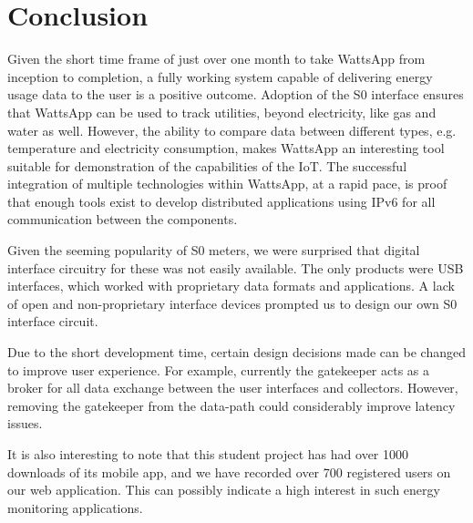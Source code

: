 \documentclass[10pt, conference, compsocconf]{IEEEtran}
\begin{document}
\section{Conclusion}

Given the short time frame of just over one month to take WattsApp
from inception to completion, a fully working system capable of delivering
energy usage data to the user is a positive outcome. Adoption of the S0 interface ensures that WattsApp can be used to track utilities, beyond electricity, like gas and water as well. However, the ability to compare
data between different types, e.g. temperature and electricity consumption,
makes WattsApp an interesting tool suitable for demonstration of the
capabilities of the IoT. The successful integration
of multiple technologies within WattsApp, at a rapid pace, is proof
that enough tools exist to develop distributed applications using
IPv6 for all communication between the components.

Given the seeming popularity of S0 meters, we were surprised that digital interface circuitry for these was not easily available. The only products were USB interfaces, which worked with proprietary
data formats and applications. A lack of open and non-proprietary
interface devices prompted us to design our own S0 interface circuit.

Due to the short development time, certain design decisions made can be changed to improve user experience. For example, currently the gatekeeper acts as a broker for all data exchange between the user interfaces and collectors. However, removing the gatekeeper from the data-path could considerably improve latency issues.

It is also interesting to note that this student project has had over
1000 downloads of its mobile app, and we have recorded over 700 registered
users on our web application. This can possibly indicate a high interest
in such energy monitoring applications.



\end{document}
